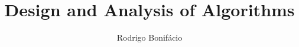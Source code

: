 \documentclass{beamer}
\title{Design and Analysis of Algorithms}
\author{Rodrigo Bonif\'{a}cio}
\begin{document}
\begin{frame}
\titlepage
\end{frame}


%
%
%
%


\end{document}
